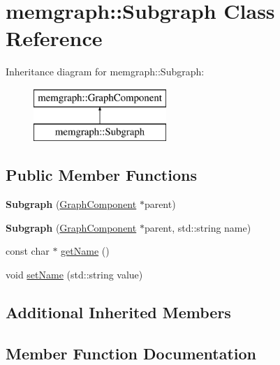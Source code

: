 \hypertarget{classmemgraph_1_1_subgraph}{}\section{memgraph\+:\+:Subgraph Class Reference}
\label{classmemgraph_1_1_subgraph}
Inheritance diagram for memgraph\+:\+:Subgraph\+:\begin{figure}[H]
\begin{center}
\leavevmode
\includegraphics[height=2.000000cm]{classmemgraph_1_1_subgraph}
\end{center}
\end{figure}
\subsection*{Public Member Functions}
\begin{DoxyCompactItemize}
\item 
{\bfseries Subgraph} (\hyperlink{classmemgraph_1_1_graph_component}{Graph\+Component} $\ast$parent)\hypertarget{classmemgraph_1_1_subgraph_aaad8e1b9df253b3d390bf7c1da4a55ae}{}\label{classmemgraph_1_1_subgraph_aaad8e1b9df253b3d390bf7c1da4a55ae}

\item 
{\bfseries Subgraph} (\hyperlink{classmemgraph_1_1_graph_component}{Graph\+Component} $\ast$parent, std\+::string name)\hypertarget{classmemgraph_1_1_subgraph_a9e46d3140367720eb2334245ec2a4175}{}\label{classmemgraph_1_1_subgraph_a9e46d3140367720eb2334245ec2a4175}

\item 
const char $\ast$ \hyperlink{classmemgraph_1_1_subgraph_a6fec7a234dcec41955f85e9b61d1b90f}{get\+Name} ()
\item 
void \hyperlink{classmemgraph_1_1_subgraph_ac1f0d59aa6300f233fd60210e7825ccb}{set\+Name} (std\+::string value)
\end{DoxyCompactItemize}
\subsection*{Additional Inherited Members}


\subsection{Member Function Documentation}
